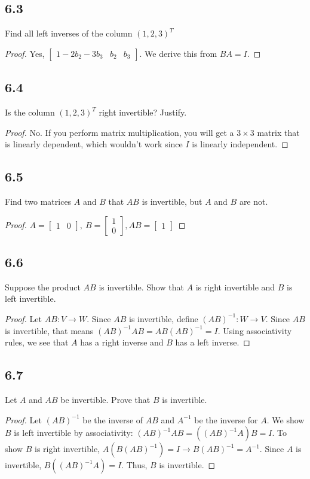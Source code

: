 \documentclass{amsart}
\begin{document}
\subsection*{6.3} Find all left inverses of the column $(1,2,3)^T$
\begin{proof}
    Yes,   $\begin{bmatrix}
        1 - 2b_2 - 3b_3 & b_2 & b_3
    \end{bmatrix}$. We derive this from $BA = I$. 
\end{proof}
\subsection*{6.4} Is the column $(1,2,3)^T$ right invertible? Justify. 
\begin{proof}
   No. If you perform matrix multiplication, you will get a $3\times3$ matrix that is linearly dependent, which wouldn't work since $I$ is linearly independent. 
\end{proof}
\subsection*{6.5} Find two matrices $A$ and $B$ that $AB$ is invertible, but $A$ and $B$ are not. 
\begin{proof}
    $A = \begin{bmatrix}
     1 & 0 
    \end{bmatrix}, \ B = \begin{bmatrix}
        1 \\ 0
    \end{bmatrix}, AB = \begin{bmatrix}
        1 
    \end{bmatrix}$
\end{proof}
\subsection*{6.6} Suppose the product $AB$ is invertible. Show that $A$ is right invertible and $B$ is left invertible.
\begin{proof}
    Let $AB: V \rightarrow W$. Since $AB$ is invertible, define $(AB)^{-1}: W \rightarrow V$. Since $AB$ is invertible, that means $(AB)^{-1}AB = AB(AB)^{-1}=I$. Using associativity rules, we see that $A$ has a right inverse and $B$ has a left inverse. 
\end{proof}
\subsection*{6.7} Let $A$ and $AB$ be invertible. Prove that $B$ is invertible.
\begin{proof}
    Let $(AB)^{-1}$ be the inverse of $AB$ and $A^{-1}$ be the inverse for $A$. We show $B$ is left invertible by associativity: $(AB)^{-1}AB = ((AB)^{-1}A)B = I$. To show $B$ is right invertible, $A(B(AB)^{-1})= I \rightarrow B(AB)^{-1} = A^{-1}$. Since $A$ is invertible, $B((AB)^{-1}A)= I$. Thus, $B$ is invertible. 
\end{proof}
\end{document}
